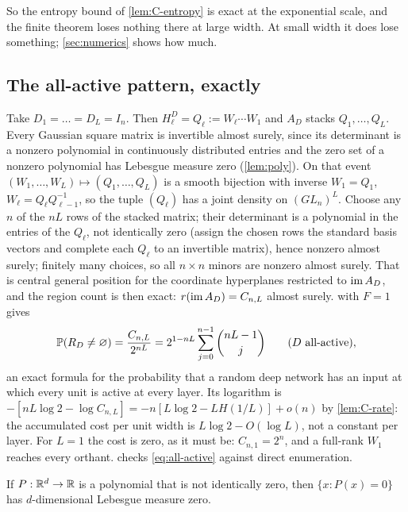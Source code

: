 So the entropy bound of \cref{lem:C-entropy} is exact at the exponential scale, and the finite theorem loses nothing there at large width. At small width it does lose something; \cref{sec:numerics} shows how much.

\subsection{The all-active pattern, exactly}

Take $D_1=\dots=D_L=I_n$. Then $H^D_\ell=Q_\ell:=W_\ell\cdots W_1$ and $A_D$ stacks $Q_1,\dots,Q_L$. Every Gaussian square matrix is invertible almost surely, since its determinant is a nonzero polynomial in continuously distributed entries and the zero set of a nonzero polynomial has Lebesgue measure zero (\cref{lem:poly}). On that event $(W_1,\dots,W_L)\mapsto(Q_1,\dots,Q_L)$ is a smooth bijection with inverse $W_1=Q_1$, $W_\ell=Q_\ell Q_{\ell-1}^{-1}$, so the tuple $(Q_\ell)$ has a joint density on $(GL_n)^L$. Choose any $n$ of the $nL$ rows of the stacked matrix; their determinant is a polynomial in the entries of the $Q_\ell$, not identically zero (assign the chosen rows the standard basis vectors and complete each $Q_\ell$ to an invertible matrix), hence nonzero almost surely; finitely many choices, so all $n\times n$ minors are nonzero almost surely. That is central general position for the coordinate hyperplanes restricted to $\operatorname{im} A_D$, and the region count is then exact: $r(\operatorname{im} A_D)=C_{n,L}$ almost surely.  with $F=1$ gives
\begin{equation}\label{eq:all-active}
\mathbb{P}(R_D\ne\varnothing)=\frac{C_{n,L}}{2^{nL}}=2^{1-nL}\sum_{j=0}^{n-1}\binom{nL-1}j\qquad(D\text{ all-active}),
\end{equation}
an exact formula for the probability that a random deep network has an input at which every unit is active at every layer. Its logarithm is $-[nL\log2-\log C_{n,L}]=-n[L\log2-LH(1/L)]+o(n)$ by \cref{lem:C-rate}: the accumulated cost per unit width is $L\log2-O(\log L)$, not a constant per layer. For $L=1$ the cost is zero, as it must be: $C_{n,1}=2^n$, and a full-rank $W_1$ reaches every orthant.  checks \cref{eq:all-active} against direct enumeration.

\begin{lemma}\label{lem:poly}
If $P:\mathbb{R}^d\to\mathbb{R}$ is a polynomial that is not identically zero, then $\{x:P(x)=0\}$ has $d$-dimensional Lebesgue measure zero.
\end{lemma}

